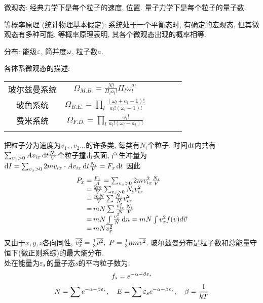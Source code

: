 \documentclass[UTF8,8pt]{ctexart}
\begin{document}
\begin{multicols}{3}
        微观态: 经典力学下是每个粒子的速度, 位置. 量子力学下是每个粒子的量子数. 
    
        等概率原理 (统计物理基本假定): 系统处于一个平衡态时, 有确定的宏观态, 但其微观态有多种可能. 等概率原理表明, 其各个微观态出现的概率相等. 
    
        分布: 能级$\varepsilon$, 简并度$\omega$, 粒子数$a$. 
    
        各体系微观态的描述: 
        \begin{tabular}{cccccc}
            玻尔兹曼系统 & $\Omega_{M . B .}=\frac{N !}{\Pi_{l} a_{l} !} \Pi_{l} \omega_{l}^{a_{l}}$                                 &  &  &  &  \\
            玻色系统   & $\Omega_{B . E .}=\prod_{l} \frac{\left(\omega_{l}+a_{l}-1\right) !}{a_{l} !\left(\omega_{l}-1\right) !}$ &  &  &  &  \\
            费米系统   & $\Omega_{F . D .}=\prod_{l} \frac{\omega_{l} !}{a_l!\left(\omega_{l}-a_{l}\right) !}$                   &  &  &  &  \\
                   &                                                                                                           &  &  &  & 
            \end{tabular}
        把粒子分为速度为$v_1,,v_2...$的许多类, 每类有$N_i$个粒子. 时间$\mathop{}\!\mathrm{d} t$内共有$\sum_{v_x>0} Av_{ix}\mathop{}\!\mathrm{d} t\frac{N_i}{V}$个粒子撞击表面, 产生冲量为$\mathop{}\!\mathrm{d} I=\sum_{v_x>0} 2mv_{ix} \cdot Av_{ix}\mathop{}\!\mathrm{d} t\frac{N_i}{V}=F_x\mathop{}\!\mathrm{d} t$
        因此
        $$\ar{
            P_x\x \f{F_x}{A}=\sum_{v_x>0} 2mv_{ix}^2\f{N_i}{V}\\
            \x \f{2m}{V}\sum_{v_x>0} N_iv_{ix}^2\\
            \x \f{mN}{V}\sum \f{N_i}{N}v_{ix}^2\\
            \x  mN\sum \f{v_{ix}^2}{N}\f{N_i}{V}\\
            \x mN\int \f{v_x^2}{N}\d n=mN\int v_x^2f(v)d\vec{v}\\
            \x mN\bar{v_x^2}
        }$$
        又由于$x,y,z$各向同性, $\bar{v_x^2}=\ff{3}\bar{v^2},\ P=\ff{3}nm\bar{v^2}$.
    玻尔兹曼分布是粒子数和总能量守恒下(微正则系综)的最大熵分布.\\
    处在能量为$\varepsilon_s$的量子态$s$的平均粒子数为:
    $$f_s=e^{-\alpha-\beta\varepsilon_s}$$
    $$N=\sum e^{-\alpha-\beta\varepsilon_s}, \quad E=\sum \varepsilon_s e^{-\alpha-\beta\varepsilon_s}, \quad \beta=\frac{1}{kT}$$
    

\end{multicols}
\end{document}
